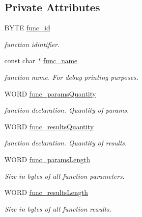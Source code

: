\subsection*{Private Attributes}
\begin{DoxyCompactItemize}
\item 
BYTE \hyperlink{classfunctionNode_a57622265a83e829d3bf9398b37e64d4c}{func\_\-id}
\begin{DoxyCompactList}\small\item\em function idintifier. \item\end{DoxyCompactList}\item 
const char $\ast$ \hyperlink{classfunctionNode_af96291f4eb06252ac63bc303b73059ed}{func\_\-name}
\begin{DoxyCompactList}\small\item\em function name. For debug printing purposes. \item\end{DoxyCompactList}\item 
WORD \hyperlink{classfunctionNode_a461172016ad26ecc31ef69903404cdf4}{func\_\-paramsQuantity}
\begin{DoxyCompactList}\small\item\em function declaration. Quantity of params. \item\end{DoxyCompactList}\item 
WORD \hyperlink{classfunctionNode_aef26d02725489ecb8e6cfe169736e395}{func\_\-resultsQuantity}
\begin{DoxyCompactList}\small\item\em function declaration. Quantity of results. \item\end{DoxyCompactList}\item 
WORD \hyperlink{classfunctionNode_ace4690387e94d2d3bdeecf810af9f394}{func\_\-paramsLength}
\begin{DoxyCompactList}\small\item\em Size in bytes of all function parameters. \item\end{DoxyCompactList}\item 
WORD \hyperlink{classfunctionNode_a7e10a910431de31b84a2979c52612127}{func\_\-resultsLength}
\begin{DoxyCompactList}\small\item\em Size in bytes of all function reaults. \item\end{DoxyCompactList}\item 

\end{DoxyCompactItemize}
